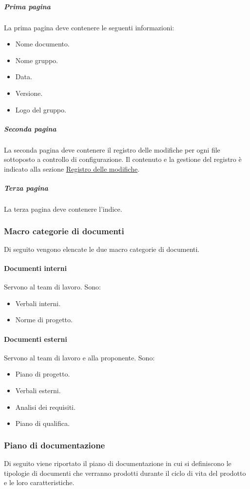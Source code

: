 \subparagraph{Prima pagina}
La prima pagina deve contenere le seguenti informazioni:
\begin{itemize}
    \item Nome documento.     
    \item Nome gruppo.
    \item Data. 
    \item Versione.
    \item Logo del gruppo.
\end{itemize}

\subparagraph{Seconda pagina}
La seconda pagina deve contenere il registro delle modifiche per ogni file sottoposto a controllo di configurazione.
Il contenuto e la gestione del registro è indicato alla sezione \hyperref[par:registro_delle_modifiche]{Registro delle modifiche}.

\subparagraph{Terza pagina}
La terza pagina deve contenere l'indice.

\subsubsection{Macro categorie di documenti}
Di seguito vengono elencate le due macro categorie di documenti. 

\paragraph{Documenti interni}
Servono al team di lavoro.
Sono:
\begin{itemize}
    \item Verbali interni.
    \item Norme di progetto.
\end{itemize}

\paragraph{Documenti esterni}
Servono al team di lavoro e alla proponente.
Sono:
\begin{itemize}
    \item Piano di progetto.
    \item Verbali esterni.
    \item Analisi dei requisiti.
    \item Piano di qualifica.
\end{itemize}

\subsubsection{Piano di documentazione}
Di seguito viene riportato il piano di documentazione in cui si definiscono le tipologie di documenti che verranno prodotti durante il ciclo di vita del prodotto e le loro caratteristiche.

